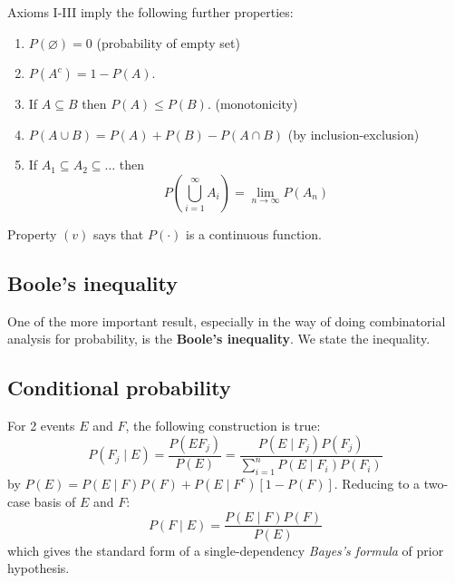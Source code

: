 \begin{theorem}[Properties of $P$]
    Axioms I-III imply the following further properties: 
    \begin{enumerate}[label=\roman*.]
        \item $P(\varnothing)=0$ (probability of empty set)
        \item $P(A^{c})=1-P(A)$.
        \item If $A\subseteq B$ then $P(A)\leq P(B)$. (monotonicity)
        \item $P(A\cup B) = P(A)+P(B)-P(A\cap B)$ (by inclusion-exclusion)
        \item If $A_{1}\subseteq A_{2}\subseteq \dots$ then \begin{equation}
            P \left(\bigcup^{\infty}_{i=1}A_{i}\right) = \lim_{n\to\infty} P(A_n)
        \end{equation}
    \end{enumerate}
    Property $(v)$ says that $P(\cdot)$ is a continuous function.
\end{theorem}

\subsection{Boole's inequality}
One of the more important result, especially in the way of doing combinatorial analysis for probability, is the \textbf{Boole's inequality}. We state the inequality. 

\subsection{Conditional probability}

\begin{definition}
    For 2 events $E$ and $F$, the following construction is true: 
    \begin{equation}
        P(F_{j}\mid E)=\frac{P(EF_{j})}{P(E)}=\frac{P(E\mid F_{j})P(F_{j})}{\displaystyle{\sum^{n}_{i=1}P(E\mid F_{i})P(F_{i})}}
    \end{equation} by $P(E)=P(E\mid F)P(F)+P(E\mid F^{c})[1-P(F)]$. Reducing to a two-case basis of $E$ and $F$: \begin{equation}
        P(F\mid E)=\frac{P(E\mid F)P(F)}{P(E)}
    \end{equation}
    which gives the standard form of a single-dependency \textit{Bayes's formula} of prior hypothesis. 
\end{definition}

